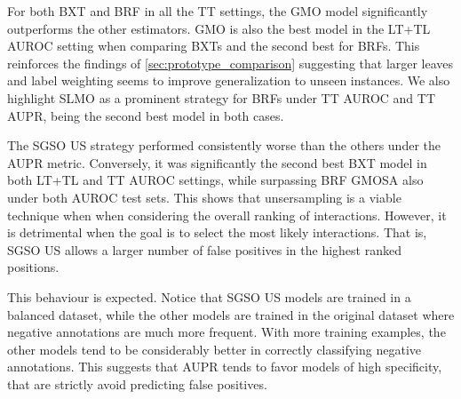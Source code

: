 For both BXT and BRF in all the TT settings, the GMO model significantly outperforms the other estimators. GMO is also the best model in the LT+TL AUROC setting when comparing BXTs and the second best for BRFs. This reinforces the findings of \autoref{sec:prototype_comparison} suggesting that larger leaves and label weighting seems to improve generalization to unseen instances.
%
We also highlight SLMO as a prominent strategy for BRFs under TT AUROC and TT AUPR, being the second best model in both cases.

The SGSO US strategy performed consistently worse than the others under the AUPR metric. Conversely, it was significantly the second best BXT model in both LT+TL and TT AUROC settings, while surpassing BRF GMOSA also under both AUROC test sets.
This shows that unsersampling is a viable technique when when considering the overall ranking of interactions. However, it is detrimental when the goal is to select the most likely interactions. That is, SGSO US allows a larger number of false positives in the highest ranked positions.

This behaviour is expected. Notice that SGSO US models are trained in a balanced dataset, while the other models are trained in the original dataset where negative annotations are much more frequent. With more training examples, the other models tend to be considerably better in correctly classifying negative annotations. This suggests that AUPR tends to favor models of high specificity, that are strictly avoid predicting false positives.





